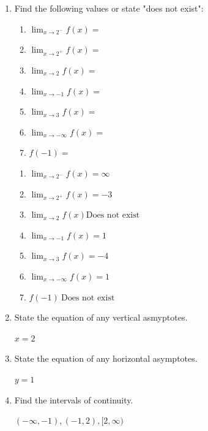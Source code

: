 \documentclass[nooutcomes, handout]{ximera}
\begin{document}
\begin{problem}
\begin{enumerate}
		\item Find the following values or state "does not exist":
			\begin{enumerate}
 			\item $\lim_{x \to 2^-} f(x)=$
			\item $\lim_{x \to 2^+} f(x)=$
			\item $\lim_{x \to 2} f(x)=$
			\item $\lim_{x \to -1} f(x)=$
			\item $\lim_{x \to 3} f(x)=$
			\item $\lim_{x \to -\infty} f(x)=$
			\item $f(-1)=$
			\end{enumerate}
		\begin{freeResponse}
			\begin{enumerate}
 			\item $\lim_{x \to 2^-} f(x)=\infty$
			\item $\lim_{x \to 2^+} f(x)=-3$
			\item $\lim_{x \to 2} f(x) \text{Does not exist}$
			\item $\lim_{x \to -1} f(x)=1$
			\item $\lim_{x \to 3} f(x)=-4$
			\item $\lim_{x \to -\infty} f(x)=1$
			\item $f(-1)\  \text{Does not exist}$
			\end{enumerate}
		\end{freeResponse}


		\item State the equation of any vertical asmyptotes.
			\begin{freeResponse}
			$x=2$
			\end{freeResponse}


		\item State the equation of any horizontal asymptotes.
			\begin{freeResponse}
			$y=1$
			\end{freeResponse}
	
		\item Find the intervals of continuity.
			\begin{freeResponse}
			$(-\infty,-1),(-1,2),[2,\infty)$
			\end{freeResponse}
	
	\end{enumerate}
\end{problem}
\end{document}
